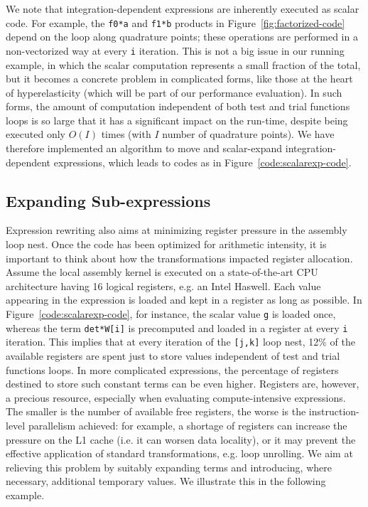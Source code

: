 We note that integration-dependent expressions are inherently executed as scalar code. For example, the \texttt{f0*a} and \texttt{f1*b} products in Figure~\ref{fig:factorized-code} depend on the loop along quadrature points; these operations are performed in a non-vectorized way at every \texttt{i} iteration. This is not a big issue in our running example, in which the scalar computation represents a small fraction of the total, but it becomes a concrete problem in complicated forms, like those at the heart of hyperelasticity (which will be part of our performance evaluation). In such forms, the amount of computation independent of both test and trial functions loops is so large that it has a significant impact on the run-time, despite being executed only $O(I)$ times (with $I$ number of quadrature points). We have therefore implemented an algorithm to move and scalar-expand integration-dependent expressions, which leads to codes as in Figure~\ref{code:scalarexp-code}.

\subsection{Expanding Sub-expressions}
\label{sec:coffee-expansion}

Expression rewriting also aims at minimizing register pressure in the assembly loop nest. Once the code has been optimized for arithmetic intensity, it is important to think about how the transformations impacted register allocation. Assume the local assembly kernel is executed on a state-of-the-art CPU architecture having 16 logical registers, e.g. an Intel Haswell. Each value appearing in the expression is loaded and kept in a register as long as possible. In Figure~\ref{code:scalarexp-code}, for instance, the scalar value \texttt{g} is loaded once, whereas the term \texttt{det*W[i]} is precomputed and loaded in a register at every \texttt{i} iteration. This implies that at every iteration of the \texttt{[j,k]} loop nest, 12$\%$ of the available registers are spent just to store values independent of test and trial functions loops. In more complicated expressions, the percentage of registers destined to store such constant terms can be even higher. Registers are, however, a precious resource, especially when evaluating compute-intensive expressions. The smaller is the number of available free registers, the worse is the instruction-level parallelism achieved: for example, a shortage of registers can increase the pressure on the L1 cache (i.e. it can worsen data locality), or it may prevent the effective application of standard transformations, e.g. loop unrolling. We aim at relieving this problem by suitably expanding terms and introducing, where necessary, additional temporary values. We illustrate this in the following example.

